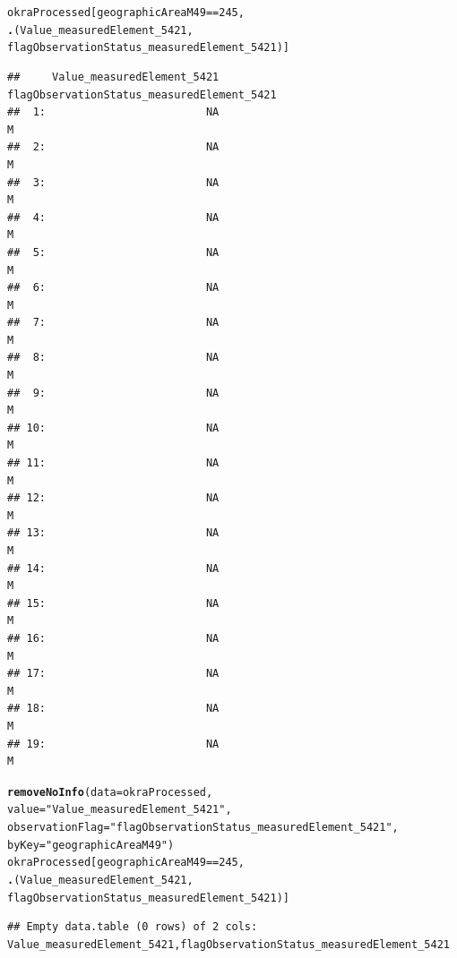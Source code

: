 \documentclass[nojss]{jss}\usepackage[]{graphicx}\usepackage[]{color}
\makeatletter
\newcommand{\hlnum}[1]{\textcolor[rgb]{0.686,0.059,0.569}{#1}}%
\newcommand{\hlstr}[1]{\textcolor[rgb]{0.192,0.494,0.8}{#1}}%
\newcommand{\hlopt}[1]{\textcolor[rgb]{0,0,0}{#1}}%
\newcommand{\hlstd}[1]{\textcolor[rgb]{0.345,0.345,0.345}{#1}}%
\newcommand{\hlkwc}[1]{\textcolor[rgb]{0.333,0.667,0.333}{#1}}%
\newcommand{\hlkwd}[1]{\textcolor[rgb]{0.737,0.353,0.396}{\textbf{#1}}}%
\newenvironment{kframe}{%
 \def\at@end@of@kframe{}%
 \ifinner\ifhmode%
  \def\at@end@of@kframe{\end{minipage}}%
  \begin{minipage}{\columnwidth}%
 \fi\fi%
 \def\FrameCommand##1{\hskip\@totalleftmargin \hskip-\fboxsep
 \colorbox{shadecolor}{##1}\hskip-\fboxsep
     \hskip-\linewidth \hskip-\@totalleftmargin \hskip\columnwidth}%
 \MakeFramed {\advance\hsize-\width
   \@totalleftmargin\z@ \linewidth\hsize
   \@setminipage}}%
 {\par\unskip\endMakeFramed%
 \at@end@of@kframe}
\newenvironment{knitrout}{}{} %
\makeatother
\begin{document}
\begin{knitrout}
\color{fgcolor}\begin{kframe}
\begin{alltt}
\hlstd{okraProcessed[geographicAreaM49} \hlopt{==} \hlnum{245}\hlstd{,}
              \hlkwd{.}\hlstd{(Value_measuredElement_5421,}
                \hlstd{flagObservationStatus_measuredElement_5421)]}
\end{alltt}
\begin{verbatim}
##     Value_measuredElement_5421 flagObservationStatus_measuredElement_5421
##  1:                         NA                                          M
##  2:                         NA                                          M
##  3:                         NA                                          M
##  4:                         NA                                          M
##  5:                         NA                                          M
##  6:                         NA                                          M
##  7:                         NA                                          M
##  8:                         NA                                          M
##  9:                         NA                                          M
## 10:                         NA                                          M
## 11:                         NA                                          M
## 12:                         NA                                          M
## 13:                         NA                                          M
## 14:                         NA                                          M
## 15:                         NA                                          M
## 16:                         NA                                          M
## 17:                         NA                                          M
## 18:                         NA                                          M
## 19:                         NA                                          M
\end{verbatim}
\begin{alltt}
\hlkwd{removeNoInfo}\hlstd{(}\hlkwc{data} \hlstd{= okraProcessed,}
             \hlkwc{value} \hlstd{=} \hlstr{"Value_measuredElement_5421"}\hlstd{,}
             \hlkwc{observationFlag} \hlstd{=} \hlstr{"flagObservationStatus_measuredElement_5421"}\hlstd{,}
             \hlkwc{byKey} \hlstd{=} \hlstr{"geographicAreaM49"}\hlstd{)}
\hlstd{okraProcessed[geographicAreaM49} \hlopt{==} \hlnum{245}\hlstd{,}
              \hlkwd{.}\hlstd{(Value_measuredElement_5421,}
                \hlstd{flagObservationStatus_measuredElement_5421)]}
\end{alltt}
\begin{verbatim}
## Empty data.table (0 rows) of 2 cols: Value_measuredElement_5421,flagObservationStatus_measuredElement_5421
\end{verbatim}
\end{kframe}
\end{knitrout}
\end{document}
